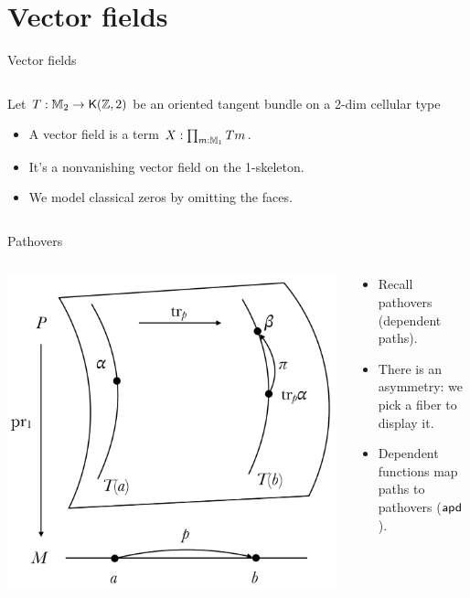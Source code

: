 \documentclass[14pt,aspectratio=169]{beamer}
\begin{document}
\section{Vector fields}
\begin{frame}{Vector fields}
\begin{columns}
\begin{column}{0.7\textwidth}
Let \( T:\mathbb{M}_2\to\mathsf{K}(\mathbb{Z},2) \) be an oriented tangent bundle on a 2-dim cellular type
\begin{itemize}
\item A \alert{vector field} is a term \alert{\( X:\prod_{m:\mathbb{M}_1}Tm \)}.
\item It's a \alert{nonvanishing} vector field on the 1-skeleton.
\item We model classical zeros by omitting the faces.
\end{itemize}
\end{column}
\begin{column}{0.3\textwidth}

\end{column}
\end{columns}
\end{frame}

\begin{frame}{Pathovers}
\begin{columns}
\begin{column}{0.55\textwidth}
\includegraphics[width=30ex]{figs/pathovers.pdf}
\end{column}
\begin{column}{0.45\textwidth}
\begin{itemize}
\item Recall pathovers (dependent paths).
\item There is an asymmetry: we pick a fiber to display it.
\item Dependent functions map paths to pathovers (\( \mathsf{apd} \)).
\end{itemize}
\end{column}
\end{columns}
\end{frame}
\end{document}
